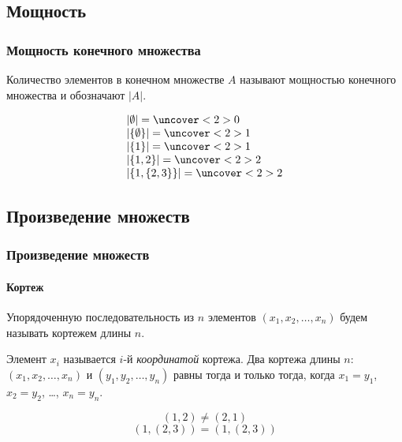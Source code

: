 \subsection{Мощность}

\begin{frame}
    \frametitle{Мощность конечного множества}
    
    \begin{definition}
        Количество элементов в \alert{конечном} множестве $A$ называют \alert{мощностью конечного множества} и обозначают $|A|$.
    \end{definition}
    
    \begin{example}
        \[
            \begin{array}{l}
                |\emptyset|=\uncover<2>{0}\\
                |\{\emptyset\}|=\uncover<2>{1}\\
                |\{1\}|=\uncover<2>{1}\\
                |\{1,2\}|=\uncover<2>{2}\\
                |\{1,\{2,3\}\}|=\uncover<2>{2}
            \end{array}
        \]
    \end{example}
\end{frame}


\subsection{Произведение множеств}

\begin{frame}
    \frametitle{Произведение множеств}
    \framesubtitle{Кортеж}
    
    \begin{definition}
        Упорядоченную последовательность из $n$ элементов $(x_1,x_2,\ldots,x_n)$ будем называть \alert{кортежем} длины $n$. 
    \end{definition}
    
    Элемент $x_i$ называется $i$-й \emph{координатой} кортежа. Два кортежа длины $n$: $(x_1,x_2,\ldots,x_n)$ и $(y_1,y_2,\ldots,y_n)$ равны тогда и только тогда, когда $x_1=y_1$, $x_2=y_2$, \ldots, $x_n=y_n$.
    
    \begin{example}
        \[(1,2)\neq(2,1)\]
        \[(1,(2,3))=(1,(2,3))\]
    \end{example}
\end{frame}

